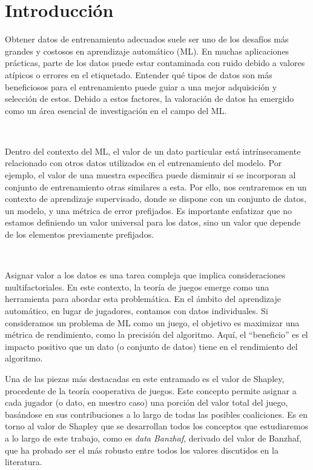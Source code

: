 \chapter{Introducción}
\justifying

Obtener datos de entrenamiento adecuados suele ser uno de los
desafíos más grandes y costosos en aprendizaje automático (ML).
 En muchas aplicaciones prácticas, parte de los datos
puede estar contaminada con ruido debido a valores atípicos o errores
en el etiquetado. Entender qué tipos de datos son más
beneficiosos para el entrenamiento puede guiar a una mejor
adquisición y selección de estos. Debido a estos factores,
la valoración de datos ha emergido como un área esencial de
investigación en el campo del ML.

\

Dentro del contexto del ML, el valor de un dato particular
está intrínsecamente relacionado con otros datos utilizados
en el entrenamiento del modelo. Por ejemplo, el valor de una
muestra específica puede disminuir si se incorporan al conjunto
de entrenamiento otras similares a esta. Por ello,
nos centraremos en un contexto de aprendizaje
supervisado, donde se dispone con un conjunto de datos, un modelo,
y una métrica de error prefijados. Es importante enfatizar que
no estamos definiendo un valor universal para los datos, sino
un valor que depende de los elementos previamente prefijados.

\

Asignar valor a los datos es una tarea
compleja que implica consideraciones multifactoriales.
En este contexto, la teoría de juegos emerge como una
herramienta para abordar esta problemática.
En el ámbito del aprendizaje automático, en lugar de jugadores,
contamos con datos individuales. Si consideramos un problema de
ML como un juego, el objetivo es maximizar
una métrica de rendimiento, como la precisión del algoritmo.
Aquí, el ``beneficio'' es el impacto positivo que un dato
(o conjunto de datos) tiene en el rendimiento del algoritmo.

Una de las piezas más destacadas en este entramado es el
valor de Shapley, procedente de la teoría
cooperativa de juegos. Este concepto permite asignar
a cada jugador (o dato, en nuestro caso) una porción
del valor total del juego, basándose
en sus contribuciones a lo largo de todas las posibles
coaliciones. Es en torno al valor de Shapley que se
desarrollan todos los conceptos que estudiaremos a lo largo de este
trabajo, como es \textit{data Banzhaf}, derivado del
valor de Banzhaf, que ha probado ser el más robusto entre
todos los valores discutidos en la literatura.

